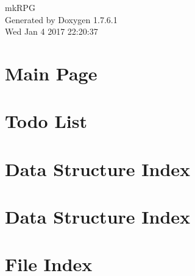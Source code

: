 \documentclass[a4paper]{book}
\begin{document}
\hypersetup{pageanchor=false,citecolor=blue}
\begin{titlepage}
\vspace*{7cm}
\begin{center}
{\Large mk\-R\-P\-G }\\
\vspace*{1cm}
{\large \-Generated by Doxygen 1.7.6.1}\\
\vspace*{0.5cm}
{\small Wed Jan 4 2017 22:20:37}\\
\end{center}
\end{titlepage}
\clearemptydoublepage
{}
\tableofcontents
\clearemptydoublepage
{}
\hypersetup{pageanchor=true,citecolor=blue}
\chapter{\-Main \-Page}
\label{index}\hypertarget{index}{}
\chapter{\-Todo \-List}
\label{todo}
\hypertarget{todo}{}

\chapter{\-Data \-Structure \-Index}

\chapter{\-Data \-Structure \-Index}

\chapter{\-File \-Index}

\end{document}
